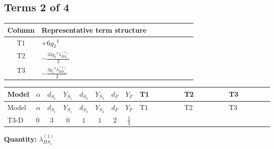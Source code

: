 \documentclass[8pt]{article}
\begin{document}
\begin{landscape}
\subsection*{Terms 2 of 4}
\begin{center}
\begin{tabular}{@{}c >{\raggedright\arraybackslash}p{0.82\linewidth}@{}}
\toprule
Column & Representative term structure \\
\midrule
T1 & \(\displaystyle +6 {g_2}^4\) \\
\midrule
T2 & \(\displaystyle -\frac{33 {g_2}^2 {\lambda_{HS_1}^{(1)}}}{2}\) \\
\midrule
T3 & \(\displaystyle -\frac{3 {g_1}^2 {\lambda_{HS_1}^{(1)}}}{2}\) \\
\midrule
\bottomrule
\end{tabular}
\end{center}
\smallskip
\tiny
\begin{longtable}{@{}llcccccc >{\raggedright\arraybackslash}p{0.21\linewidth} >{\raggedright\arraybackslash}p{0.21\linewidth} >{\raggedright\arraybackslash}p{0.21\linewidth}@{}}
\toprule
Model & $\alpha$ & $d_{S_1}$ & $Y_{S_1}$ & $d_{S_2}$ & $Y_{S_2}$ & $d_F$ & $Y_F$ & T1 & T2 & T3 \\
\midrule
\endfirsthead
\toprule
Model & $\alpha$ & $d_{S_1}$ & $Y_{S_1}$ & $d_{S_2}$ & $Y_{S_2}$ & $d_F$ & $Y_F$ & T1 & T2 & T3 \\
\midrule
\endhead
T3-D & $0$ & $3$ & $0$ & $1$ & $1$ & $2$ & $\frac{1}{2}$ & \scriptsize\adjustbox{max width=\linewidth}{$\begin{gathered} +6 {g_2}^4\end{gathered}$} & \scriptsize\adjustbox{max width=\linewidth}{$\begin{gathered} -\frac{33 {g_2}^2 {\lambda_{HS_1}^{(1)}}}{2}\end{gathered}$} & \scriptsize\adjustbox{max width=\linewidth}{$\begin{gathered} -\frac{3 {g_1}^2 {\lambda_{HS_1}^{(1)}}}{2}\end{gathered}$} \\
\midrule
\bottomrule
\end{longtable}
\clearpage
\noindent\textbf{Quantity: }$\lambda_{HS_1}^{(1)}$\par\smallskip

\end{landscape}
\end{document}
